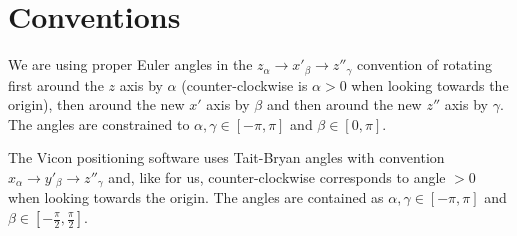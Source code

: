 \documentclass{article}
\begin{document}
\section{Conventions}
We are using proper Euler angles in the $z_\alpha \rightarrow x'_\beta \rightarrow z''_\gamma$ convention of rotating first around the $z$ axis by $\alpha$ (counter-clockwise is $\alpha > 0$ when looking towards the origin), then around the new $x'$ axis by $\beta$ and then around the new $z''$ axis by $\gamma$. The angles are constrained to $\alpha, \gamma \in [-\pi, \pi]$ and $\beta \in [0, \pi]$.

The Vicon positioning software uses Tait-Bryan angles with convention $x_\alpha \rightarrow y'_\beta \rightarrow z''_\gamma$ and, like for us, counter-clockwise corresponds to angle $ > 0$ when looking towards the origin. The angles are contained as $\alpha, \gamma \in [-\pi, \pi]$ and $\beta \in [-\frac{\pi}{2}, \frac{\pi}{2}]$.
\end{document}
